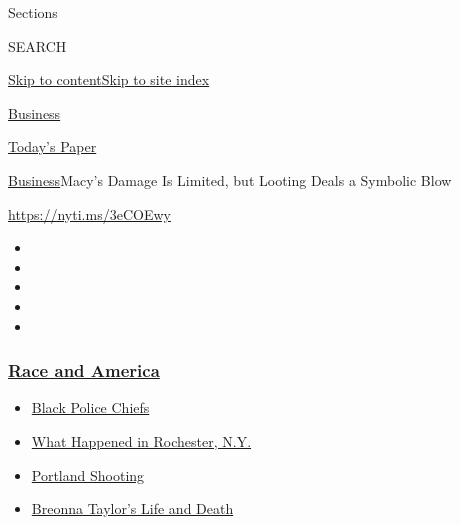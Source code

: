 Sections

SEARCH

\protect\hyperlink{site-content}{Skip to
content}\protect\hyperlink{site-index}{Skip to site index}

\href{https://www.nytimes3xbfgragh.onion/section/business}{Business}

\href{https://myaccount.nytimes3xbfgragh.onion/auth/login?response_type=cookie\&client_id=vi}{}

\href{https://www.nytimes3xbfgragh.onion/section/todayspaper}{Today's
Paper}

\href{/section/business}{Business}\textbar{}Macy's Damage Is Limited,
but Looting Deals a Symbolic Blow

\url{https://nyti.ms/3eCOEwy}

\begin{itemize}
\item
\item
\item
\item
\item
\end{itemize}

\hypertarget{race-and-america}{%
\subsubsection{\texorpdfstring{\href{https://www.nytimes3xbfgragh.onion/news-event/george-floyd-protests-minneapolis-new-york-los-angeles?name=styln-george-floyd\&region=TOP_BANNER\&block=storyline_menu_recirc\&action=click\&pgtype=Article\&impression_id=d8d493d0-f4cb-11ea-84c2-2f39f95af737\&variant=undefined}{Race
and America}}{Race and America}}\label{race-and-america}}

\begin{itemize}
\tightlist
\item
  \href{https://www.nytimes3xbfgragh.onion/2020/09/11/us/black-police-chiefs-reform.html?name=styln-george-floyd\&region=TOP_BANNER\&block=storyline_menu_recirc\&action=click\&pgtype=Article\&impression_id=d8d493d1-f4cb-11ea-84c2-2f39f95af737\&variant=undefined}{Black
  Police Chiefs}
\item
  \href{https://www.nytimes3xbfgragh.onion/2020/09/04/nyregion/rochester-police-daniel-prude.html?name=styln-george-floyd\&region=TOP_BANNER\&block=storyline_menu_recirc\&action=click\&pgtype=Article\&impression_id=d8d4bae0-f4cb-11ea-84c2-2f39f95af737\&variant=undefined}{What
  Happened in Rochester, N.Y.}
\item
  \href{https://www.nytimes3xbfgragh.onion/2020/08/30/us/portland-shooting-explained.html?name=styln-george-floyd\&region=TOP_BANNER\&block=storyline_menu_recirc\&action=click\&pgtype=Article\&impression_id=d8d4bae1-f4cb-11ea-84c2-2f39f95af737\&variant=undefined}{Portland
  Shooting}
\item
  \href{https://www.nytimes3xbfgragh.onion/2020/08/30/us/breonna-taylor-police-killing.html?name=styln-george-floyd\&region=TOP_BANNER\&block=storyline_menu_recirc\&action=click\&pgtype=Article\&impression_id=d8d4bae2-f4cb-11ea-84c2-2f39f95af737\&variant=undefined}{Breonna
  Taylor's Life and Death}
\end{itemize}

